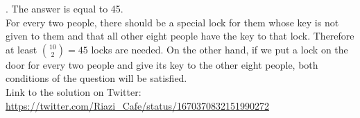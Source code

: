 \begin{solution}.
The answer is equal to 45.\\[0.2cm]

For every two people, there should be a special lock for them whose key is not given to them and that all other eight people have the key to that lock. Therefore at least $\binom{10}{2} = 45$ locks are needed. On the other hand, if we put a lock on the door for every two people and give its key to the other eight people, both conditions of the question will be satisfied. \\[0.2cm]

Link to the solution on Twitter:  \url{https://twitter.com/Riazi_Cafe/status/1670370832151990272}\end{solution}